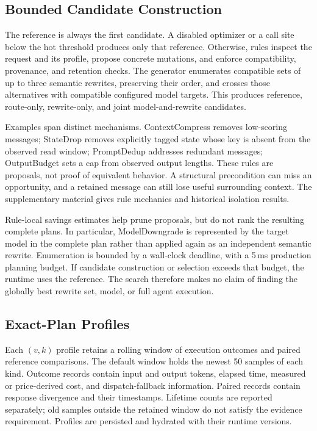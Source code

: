 \subsection{Bounded Candidate Construction}
\label{sec:candidates}

The reference is always the first candidate. A disabled optimizer or a call site
below the hot threshold produces only that reference. Otherwise, rules inspect the
request and its profile, propose concrete mutations, and enforce compatibility,
provenance, and retention checks. The generator enumerates compatible sets of up
to three semantic rewrites, preserving their order, and crosses those alternatives
with compatible configured model targets. This produces reference, route-only,
rewrite-only, and joint model-and-rewrite candidates.

Examples span distinct mechanisms. ContextCompress removes low-scoring messages;
StateDrop removes explicitly tagged state whose key is absent from the observed
read window; PromptDedup addresses redundant messages; OutputBudget sets a cap
from observed output lengths. These rules are proposals, not proof of equivalent
behavior. A structural precondition can miss an opportunity, and a retained message
can still lose useful surrounding context. The supplementary material gives rule
mechanics and historical isolation results.

Rule-local savings estimates help prune proposals, but do not rank the resulting
complete plans. In particular, ModelDowngrade is represented by the target model
in the complete plan rather than applied again as an independent semantic rewrite.
Enumeration is bounded by a wall-clock deadline, with a 5\,ms production planning
budget. If candidate construction or selection exceeds that budget, the runtime
uses the reference. The search therefore makes no claim of finding the globally
best rewrite set, model, or full agent execution.

\subsection{Exact-Plan Profiles}
\label{sec:profiles}

Each $(v,k)$ profile retains a rolling window of execution outcomes and paired
reference comparisons. The default window holds the newest 50 samples of each
kind. Outcome records contain input and output tokens, elapsed time, measured or
price-derived cost, and dispatch-fallback information. Paired records contain
response divergence and their timestamps. Lifetime counts are reported separately;
old samples outside the retained window do not satisfy the evidence requirement.
Profiles are persisted and hydrated with their runtime versions.

